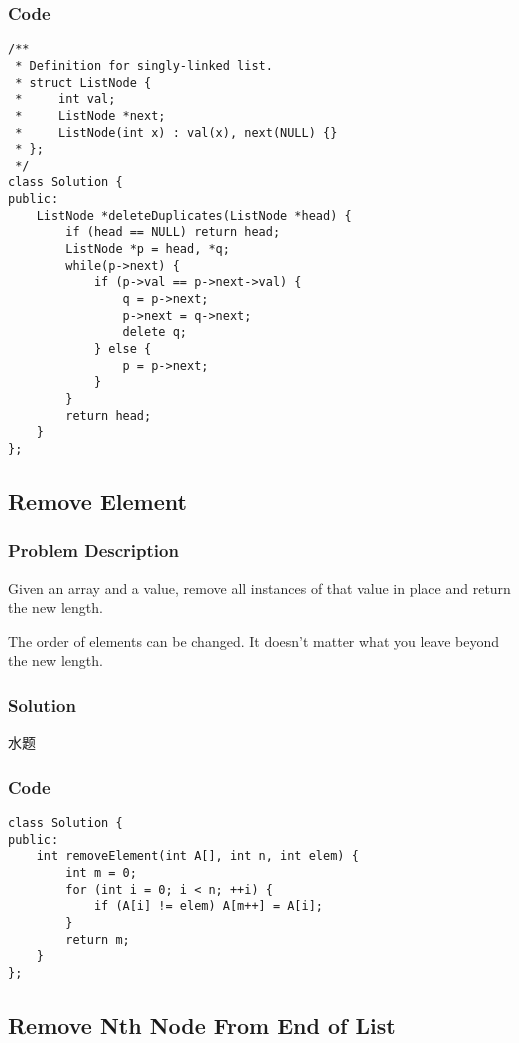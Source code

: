 \documentclass[courier]{article}
\begin{document}
\begin{CJK*}{UTF8}{gkai}
\subsubsection*{Code}
\begin{lstlisting}
/**
 * Definition for singly-linked list.
 * struct ListNode {
 *     int val;
 *     ListNode *next;
 *     ListNode(int x) : val(x), next(NULL) {}
 * };
 */
class Solution {
public:
    ListNode *deleteDuplicates(ListNode *head) {
        if (head == NULL) return head;
        ListNode *p = head, *q;
        while(p->next) {
            if (p->val == p->next->val) {
                q = p->next;
                p->next = q->next;
                delete q;
            } else {
                p = p->next;
            }
        }
        return head;
    }
}; 
\end{lstlisting}


\subsection{ Remove Element }

\subsubsection*{Problem Description}
Given an array and a value, remove all instances of that value in place and return the new length.

The order of elements can be changed. It doesn't matter what you leave beyond the new length.



\subsubsection*{Solution}
水题

\subsubsection*{Code}
\begin{lstlisting}
class Solution {
public:
    int removeElement(int A[], int n, int elem) {
        int m = 0;
        for (int i = 0; i < n; ++i) {
            if (A[i] != elem) A[m++] = A[i];
        }
        return m;
    }
}; 
\end{lstlisting}


\subsection{ Remove Nth Node From End of List }


\end{CJK*}
\end{document}
